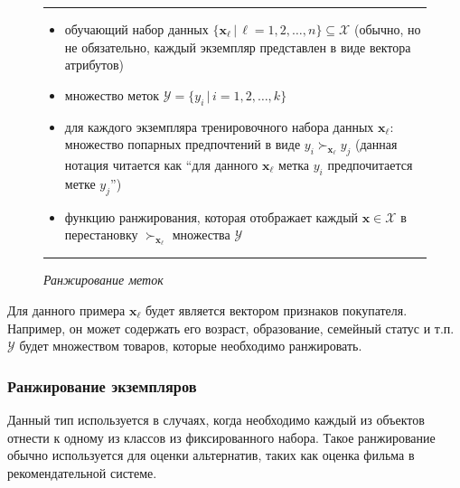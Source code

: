 	\begin{figure}[h!]
		\hrule
		\begin{description}[nosep]
			\item[Дано:] \null\leavevmode
			\begin{itemize}[itemsep=0pt,leftmargin=2ex,label=\textbf{---}]
				\item обучающий набор данных $\{\bm{x}_\ell \, | \, \ell = 1,2,\dotsc,n\} \subseteq \mathcal{X} $ (обычно, но не обязательно, каждый экземпляр представлен в виде вектора атрибутов)
				\item множество меток $\mathcal{Y} = \{y_i\,|\,i = 1,2,\dotsc,k\}$
				\item для каждого экземпляра тренировочного набора данных $\bm{x}_\ell$: множество попарных предпочтений в виде $y_i \succ_{\bm{x}_\ell} y_j $ (данная нотация читается как ``для данного $\bm{x}_\ell$  метка $y_i$ предпочитается метке $y_j$'')
			\end{itemize}
			\item[Найти:] \null\leavevmode
			\begin{itemize}[itemsep=0pt,leftmargin=2ex,label=\textbf{---}]
				\item функцию ранжирования, которая отображает каждый $\bm{x} \in \mathcal{X}$ в перестановку $\succ_{\bm{x}_\ell}$ множества $\mathcal{Y}$
			\end{itemize}
		\end{description} 
		\hrule
		\caption*{\textit{Ранжирование меток}\cite[с.~4]{plbook:Introduction:2010}}
		\label{fig:label_ranking}
	\end{figure}
	Для данного примера $\bm{x}_\ell$ будет является вектором признаков покупателя. Например, он может содержать его возраст, образование, семейный статус и т.п. $\mathcal{Y}$ будет множеством товаров, которые необходимо ранжировать.
	
	\subsubsection{Ранжирование экземпляров}
	Данный тип используется в случаях, когда необходимо каждый из объектов отнести к одному из классов из фиксированного набора. Такое ранжирование обычно используется для оценки альтернатив, таких как оценка фильма в рекомендательной системе.
	
